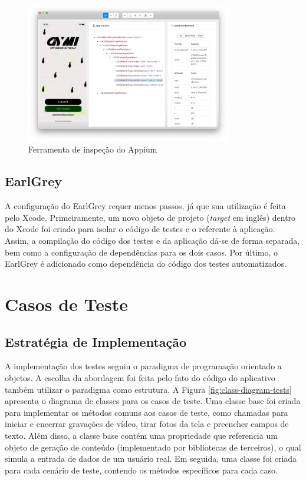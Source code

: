 \begin{figure}[H]
    \centering
    \includegraphics[width=0.8\textwidth]{pfc/figuras/appium-desktop-inspector.png}
    \caption{Ferramenta de inspeção do Appium}
    \label{fig:appium-desktop-inspector}
\end{figure}

\subsection{EarlGrey}
A configuração do EarlGrey requer menos passos, já que sua utilização é feita pelo Xcode. Primeiramente, um novo objeto de projeto (\textit{target} em inglês) dentro do Xcode foi criado para isolar o código de testes e o referente à aplicação. Assim, a compilação do código dos testes e da aplicação dá-se de forma separada, bem como a configuração de dependências para os dois casos. Por último, o EarlGrey é adicionado como dependência do código dos testes automatizados.

\section{Casos de Teste}

\subsection{Estratégia de Implementação}
A implementação dos testes seguiu o paradigma de programação orientado a objetos. A escolha da abordagem foi feita pelo fato do código do aplicativo também utilizar o paradigma como estrutura. A Figura \ref{fig:class-diagram-tests} apresenta o diagrama de classes para os casos de teste. Uma classe base foi criada para implementar os métodos comuns aos casos de teste, como chamadas para iniciar e encerrar gravações de vídeo, tirar fotos da tela e preencher campos de texto. Além disso, a classe base contém uma propriedade que referencia um objeto de geração de conteúdo (implementado por bibliotecas de terceiros), o qual simula a entrada de dados de um usuário real. Em seguida, uma classe foi criada para cada cenário de teste, contendo os métodos específicos para cada caso.

